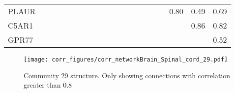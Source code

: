 \begin{longtable}{lrrrrrrrrrrrrrrrrrrr}
PLAUR   &             &             &             &            &            &             &             &            &             &              &             &           &               &             &              &             &        0.80 &        0.49 &       0.69 \\
C5AR1   &             &             &             &            &            &             &             &            &             &              &             &           &               &             &              &             &             &        0.86 &       0.82 \\
GPR77   &             &             &             &            &            &             &             &            &             &              &             &           &               &             &              &             &             &             &       0.52 \\
\end{longtable}


\begin{figure}[h!]
\centering
\texttt{[image: corr\_figures/corr\_networkBrain\_Spinal\_cord\_29.pdf]}
\caption{Community 29 structure. Only showing connections with correlation greater than 0.8}
\end{figure}


